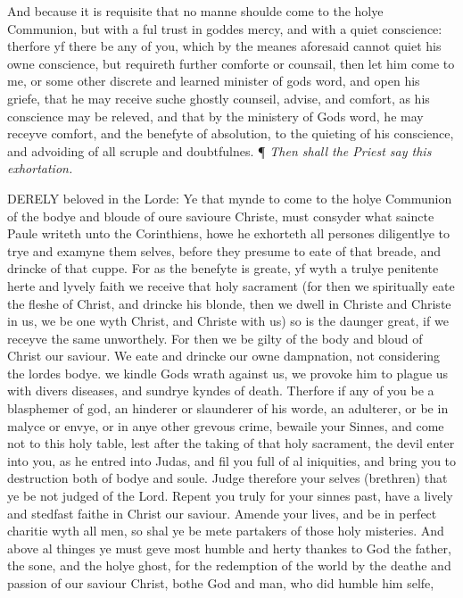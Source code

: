 And because it is requisite that no manne shoulde come
to the holye Communion, but with a ful trust in goddes mercy, and with
a quiet conscience: therfore yf there be any of you, which by the meanes
aforesaid cannot quiet his owne conscience, but requireth further comforte
or counsail, then let him come to me, or some other discrete and learned
minister of gods word, and open his griefe, that he may receive suche
ghostly counseil, advise, and comfort, as his conscience may be releved,
and that by the ministery of Gods word, he may receyve comfort, and the
benefyte of absolution, to the quieting of his conscience, and advoiding
of all scruple and doubtfulnes.
¶
\emph{Then shall the Priest say this exhortation.}

DERELY
beloved in the Lorde: Ye that mynde to come to the holye Communion of
the bodye and bloude of oure savioure Christe, must consyder what saincte
Paule writeth unto the Corinthiens, howe he exhorteth all persones diligentlye
to trye and examyne them selves, before they presume to eate of that breade,
and drincke of that cuppe. For as the benefyte is greate, yf wyth a trulye
penitente herte and lyvely faith we receive that holy sacrament (for then
we spiritually eate the fleshe of Christ, and drincke his blonde, then
we dwell in Christe and Christe in us, we be one wyth Christ, and Christe
with us) so is the daunger great, if we receyve the same unworthely. For
then we be gilty of the body and bloud of Christ our saviour. We eate
and drincke our owne dampnation, not considering the lordes bodye. we
kindle Gods wrath against us, we provoke him to plague us with divers
diseases, and sundrye kyndes of death. Therfore if any of you be a blasphemer
of god, an hinderer or slaunderer of his worde, an adulterer, or be in
malyce or envye, or in anye other grevous crime, bewaile your Sinnes,
and come not to this holy table, lest after the taking of that holy sacrament,
the devil enter into you, as he entred into Judas, and fil you full of
al iniquities, and bring you to destruction both of bodye and soule. Judge
therefore your selves (brethren) that ye be not judged of the Lord. Repent
you truly for your sinnes past, have a lively and stedfast faithe in Christ
our saviour. Amende your lives, and be in perfect charitie wyth all men,
so shal ye be mete partakers of those holy misteries. And above al thinges
ye must geve most humble and herty thankes to God the father, the sone,
and the holye ghost, for the redemption of the world by the deathe and
passion of our saviour Christ, bothe God and man, who did humble him selfe,
